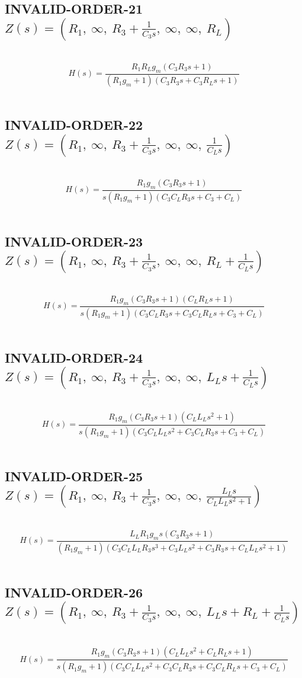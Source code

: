 \documentclass{article}
\begin{document}
\subsection{INVALID-ORDER-21 $Z(s) = \left( R_{1}, \  \infty, \  R_{3} + \frac{1}{C_{3} s}, \  \infty, \  \infty, \  R_{L}\right)$ } \ 
\textbf{\[H(s) = \frac{R_{1} R_{L} g_{m} \left(C_{3} R_{3} s + 1\right)}{\left(R_{1} g_{m} + 1\right) \left(C_{3} R_{3} s + C_{3} R_{L} s + 1\right)}\] } \ 
\subsection{INVALID-ORDER-22 $Z(s) = \left( R_{1}, \  \infty, \  R_{3} + \frac{1}{C_{3} s}, \  \infty, \  \infty, \  \frac{1}{C_{L} s}\right)$ } \ 
\textbf{\[H(s) = \frac{R_{1} g_{m} \left(C_{3} R_{3} s + 1\right)}{s \left(R_{1} g_{m} + 1\right) \left(C_{3} C_{L} R_{3} s + C_{3} + C_{L}\right)}\] } \ 
\subsection{INVALID-ORDER-23 $Z(s) = \left( R_{1}, \  \infty, \  R_{3} + \frac{1}{C_{3} s}, \  \infty, \  \infty, \  R_{L} + \frac{1}{C_{L} s}\right)$ } \ 
\textbf{\[H(s) = \frac{R_{1} g_{m} \left(C_{3} R_{3} s + 1\right) \left(C_{L} R_{L} s + 1\right)}{s \left(R_{1} g_{m} + 1\right) \left(C_{3} C_{L} R_{3} s + C_{3} C_{L} R_{L} s + C_{3} + C_{L}\right)}\] } \ 
\subsection{INVALID-ORDER-24 $Z(s) = \left( R_{1}, \  \infty, \  R_{3} + \frac{1}{C_{3} s}, \  \infty, \  \infty, \  L_{L} s + \frac{1}{C_{L} s}\right)$ } \ 
\textbf{\[H(s) = \frac{R_{1} g_{m} \left(C_{3} R_{3} s + 1\right) \left(C_{L} L_{L} s^{2} + 1\right)}{s \left(R_{1} g_{m} + 1\right) \left(C_{3} C_{L} L_{L} s^{2} + C_{3} C_{L} R_{3} s + C_{3} + C_{L}\right)}\] } \ 
\subsection{INVALID-ORDER-25 $Z(s) = \left( R_{1}, \  \infty, \  R_{3} + \frac{1}{C_{3} s}, \  \infty, \  \infty, \  \frac{L_{L} s}{C_{L} L_{L} s^{2} + 1}\right)$ } \ 
\textbf{\[H(s) = \frac{L_{L} R_{1} g_{m} s \left(C_{3} R_{3} s + 1\right)}{\left(R_{1} g_{m} + 1\right) \left(C_{3} C_{L} L_{L} R_{3} s^{3} + C_{3} L_{L} s^{2} + C_{3} R_{3} s + C_{L} L_{L} s^{2} + 1\right)}\] } \ 
\subsection{INVALID-ORDER-26 $Z(s) = \left( R_{1}, \  \infty, \  R_{3} + \frac{1}{C_{3} s}, \  \infty, \  \infty, \  L_{L} s + R_{L} + \frac{1}{C_{L} s}\right)$ } \ 
\textbf{\[H(s) = \frac{R_{1} g_{m} \left(C_{3} R_{3} s + 1\right) \left(C_{L} L_{L} s^{2} + C_{L} R_{L} s + 1\right)}{s \left(R_{1} g_{m} + 1\right) \left(C_{3} C_{L} L_{L} s^{2} + C_{3} C_{L} R_{3} s + C_{3} C_{L} R_{L} s + C_{3} + C_{L}\right)}\] } \ 
\end{document}
